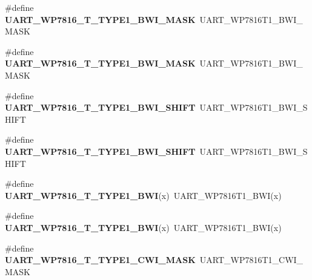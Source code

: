 \begin{DoxyCompactItemize}
\item 
\#define {\bfseries U\+A\+R\+T\+\_\+\+W\+P7816\+\_\+\+T\+\_\+\+T\+Y\+P\+E1\+\_\+\+B\+W\+I\+\_\+\+M\+A\+SK}~U\+A\+R\+T\+\_\+\+W\+P7816\+T1\+\_\+\+B\+W\+I\+\_\+\+M\+A\+SK\hypertarget{group__Backward__Compatibility__Symbols_gadb34493e13585c4acf5c3fba81e0e03f}{}\label{group__Backward__Compatibility__Symbols_gadb34493e13585c4acf5c3fba81e0e03f}

\item 
\#define {\bfseries U\+A\+R\+T\+\_\+\+W\+P7816\+\_\+\+T\+\_\+\+T\+Y\+P\+E1\+\_\+\+B\+W\+I\+\_\+\+M\+A\+SK}~U\+A\+R\+T\+\_\+\+W\+P7816\+T1\+\_\+\+B\+W\+I\+\_\+\+M\+A\+SK\hypertarget{group__Backward__Compatibility__Symbols_gadb34493e13585c4acf5c3fba81e0e03f}{}\label{group__Backward__Compatibility__Symbols_gadb34493e13585c4acf5c3fba81e0e03f}

\item 
\#define {\bfseries U\+A\+R\+T\+\_\+\+W\+P7816\+\_\+\+T\+\_\+\+T\+Y\+P\+E1\+\_\+\+B\+W\+I\+\_\+\+S\+H\+I\+FT}~U\+A\+R\+T\+\_\+\+W\+P7816\+T1\+\_\+\+B\+W\+I\+\_\+\+S\+H\+I\+FT\hypertarget{group__Backward__Compatibility__Symbols_ga23a788a5415cebd78a364d0578ee9b7c}{}\label{group__Backward__Compatibility__Symbols_ga23a788a5415cebd78a364d0578ee9b7c}

\item 
\#define {\bfseries U\+A\+R\+T\+\_\+\+W\+P7816\+\_\+\+T\+\_\+\+T\+Y\+P\+E1\+\_\+\+B\+W\+I\+\_\+\+S\+H\+I\+FT}~U\+A\+R\+T\+\_\+\+W\+P7816\+T1\+\_\+\+B\+W\+I\+\_\+\+S\+H\+I\+FT\hypertarget{group__Backward__Compatibility__Symbols_ga23a788a5415cebd78a364d0578ee9b7c}{}\label{group__Backward__Compatibility__Symbols_ga23a788a5415cebd78a364d0578ee9b7c}

\item 
\#define {\bfseries U\+A\+R\+T\+\_\+\+W\+P7816\+\_\+\+T\+\_\+\+T\+Y\+P\+E1\+\_\+\+B\+WI}(x)~U\+A\+R\+T\+\_\+\+W\+P7816\+T1\+\_\+\+B\+WI(x)\hypertarget{group__Backward__Compatibility__Symbols_ga494a1fd499433faa3dc6301dc82f2106}{}\label{group__Backward__Compatibility__Symbols_ga494a1fd499433faa3dc6301dc82f2106}

\item 
\#define {\bfseries U\+A\+R\+T\+\_\+\+W\+P7816\+\_\+\+T\+\_\+\+T\+Y\+P\+E1\+\_\+\+B\+WI}(x)~U\+A\+R\+T\+\_\+\+W\+P7816\+T1\+\_\+\+B\+WI(x)\hypertarget{group__Backward__Compatibility__Symbols_ga494a1fd499433faa3dc6301dc82f2106}{}\label{group__Backward__Compatibility__Symbols_ga494a1fd499433faa3dc6301dc82f2106}

\item 
\#define {\bfseries U\+A\+R\+T\+\_\+\+W\+P7816\+\_\+\+T\+\_\+\+T\+Y\+P\+E1\+\_\+\+C\+W\+I\+\_\+\+M\+A\+SK}~U\+A\+R\+T\+\_\+\+W\+P7816\+T1\+\_\+\+C\+W\+I\+\_\+\+M\+A\+SK\hypertarget{group__Backward__Compatibility__Symbols_gac187226c5d0a1c13888f04cb6fd837b1}{}\label{group__Backward__Compatibility__Symbols_gac187226c5d0a1c13888f04cb6fd837b1}


\end{DoxyCompactItemize}

